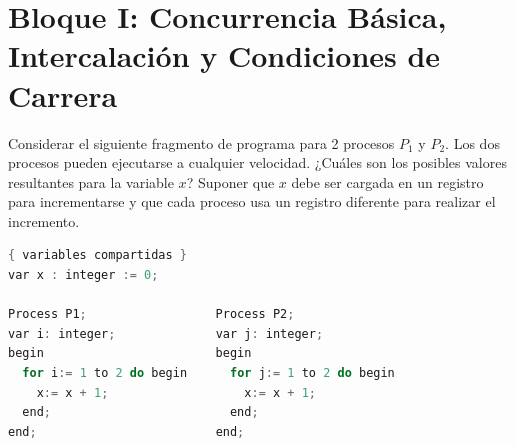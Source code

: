 \section{Bloque I: Concurrencia Básica, Intercalación y Condiciones de Carrera}

\begin{ejercicio}
Considerar el siguiente fragmento de programa para 2 procesos $P_1$ y $P_2$. Los dos procesos pueden ejecutarse a cualquier velocidad. ¿Cuáles son los posibles valores resultantes para la variable $x$? Suponer que $x$ debe ser cargada en un registro para incrementarse y que cada proceso usa un registro diferente para realizar el incremento.

\begin{lstlisting}[language=C++]
{ variables compartidas }
var x : integer := 0;

Process P1;                  Process P2;
var i: integer;              var j: integer;
begin                        begin
  for i:= 1 to 2 do begin      for j:= 1 to 2 do begin
    x:= x + 1;                   x:= x + 1;
  end;                         end;
end;                         end;
\end{lstlisting}
\end{ejercicio}

